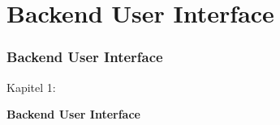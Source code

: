 %

\section{Backend User Interface}
\begin{frame}[fragile]
	\frametitle{Backend User Interface}

	\begin{center}\huge{Kapitel 1:}\end{center}
	\begin{center}\huge{\color{typo3darkgrey}\textbf{Backend User Interface}}\end{center}

\end{frame}

